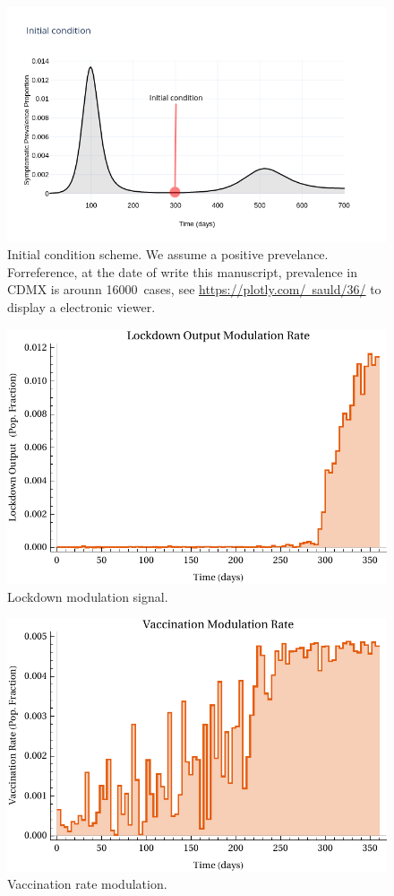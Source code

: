 \begin{figure}
    \centering
    \includegraphics[scale=0.5, keepaspectratio]{figs/InitialCondition}
    \caption[Initial condition]{
        Initial condition scheme. We assume a positive
        prevelance. Forreference, at the date of write this manuscript,
        prevalence in CDMX is
        arounn \SI{16000}{cases}, see
        \href{https://plotly.com/~sauld/36/}{https://plotly.com/~sauld/36/} to
        display a electronic viewer.}
        \label{fig:initialcondition}
\end{figure}

\begin{figure}[tbh]
    \centering
    \includegraphics[width=0.7\linewidth]{figs/lockdown_control_signal}
    \caption[Lockdown modulation signal.]{Lockdown modulation signal.}
    \label{fig:lockdowncontrolsignal}
\end{figure}

\begin{figure}
    \centering
    \includegraphics[width=0.7\linewidth]{figs/Vaccination_control_signal}
    \caption[Vaccination rate modulation.]{Vaccination rate modulation.}
    \label{fig:vaccinationcontrolsignal}
\end{figure}

